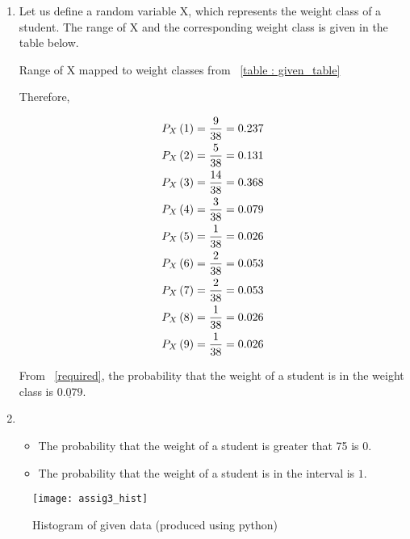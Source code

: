 \documentclass[journal,12pt,twocolumn]{IEEEtran}
\begin{document}
	\begin{enumerate}[label = \brak{\textbf{\roman*}}]
	\item
	
	Let us define a random variable X, which represents the weight class of a student. The range of X and the corresponding weight class is given in the table below.
	
	\begin{table}[h!tb]
	
		\centering
		
		\caption{Range of X mapped to weight classes from ~\ref{table : given_table}}
		
		
		
		\label{table : range_table}
		
	\end{table}
	
	
	Therefore,
	
	\begin{align}
		P_X \left(1\right) &= \frac{9}{38} = 0.237\\
		P_X \left(2\right) &= \frac{5}{38} = 0.131\\
		P_X \left(3\right) &= \frac{14}{38} = 0.368\\
		P_X \left(4\right) &= \frac{3}{38} = 0.079
			\label{required}\\
		P_X \left(5\right) &= \frac{1}{38} = 0.026\\
		P_X \left(6\right) &= \frac{2}{38} = 0.053\\
		P_X \left(7\right) &= \frac{2}{38} = 0.053\\
		P_X \left(8\right) &= \frac{1}{38} = 0.026\\
		P_X \left(9\right) &= \frac{1}{38} = 0.026
	\end{align}
	
	
	From ~\eqref{required}, the probability that the weight of a student is in the weight class  is $\underline{0.079}.$ 
		
	
	\item
	
	\begin{itemize}
	
		\item The probability that the weight of a student is greater that 75 is $0$.
		
		\item The probability that the weight of a student is in the interval  is $1$.
	
	\end{itemize}
	
	\end{enumerate}
	
	\begin{figure}[!htb]
	
		\texttt{[image: assig3\_hist]}
		\caption{Histogram of given data (produced using python)}
		
	\end{figure}
	
	
\end{document}
